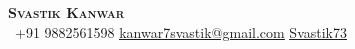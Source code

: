 \begin{center}
    \textbf{\Huge \scshape Svastik Kanwar} \\ \vspace{1pt}
     \ \small +91 9882561598 \quad
    \href{mailto:firstlast@gmail.com}{ \underline{kanwar7svastik@gmail.com}} \quad
    \href{https://github.com/Svastik73}{ \underline{Svastik73}}  
\end{center}
